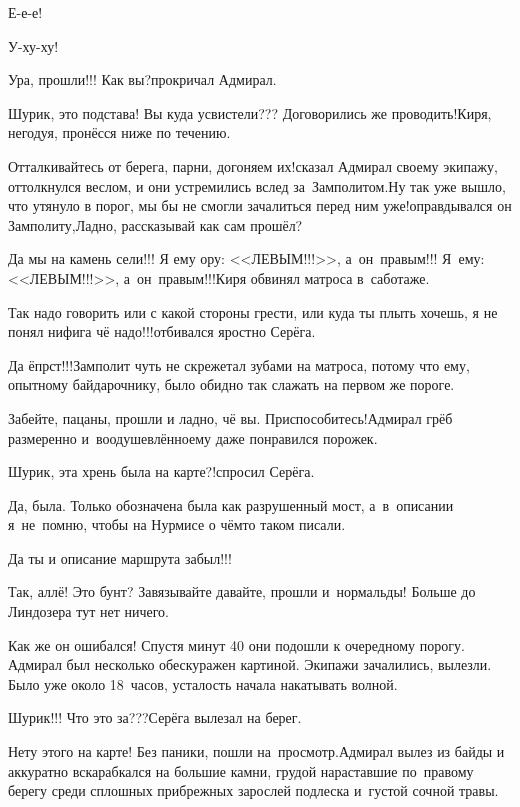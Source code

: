 \diagdash Е-е-е!

\diagdash У-ху-ху!

\diagdash Ура, прошли!!! Как вы?\mdash прокричал Адмирал.

\diagdash Шурик, это подстава! Вы куда усвистели??? Договорились же проводить!\mdash Киря, негодуя, пронёсся ниже по течению.

\diagdash Отталкивайтесь от берега, парни, догоняем их!\mdash сказал Адмирал своему экипажу, оттолкнулся веслом, и они устремились вслед за~Замполитом.\mdash Ну так уже вышло, что утянуло в порог, мы бы не смогли зачалиться перед ним уже!\mdash оправдывался он Замполиту,\mdash Ладно, рассказывай как сам прошёл?

\diagdash Да мы на камень сели!!! Я ему ору: <<ЛЕВЫМ!!!>>, а~он~правым!!! Я~ему: <<ЛЕВЫМ!!!>>, а~он~правым!!!\mdash Киря обвинял матроса в~саботаже.

\diagdash Так надо говорить или с какой стороны грести, или куда ты плыть хочешь, я не понял нифига чё надо!!!\mdash отбивался яростно Серёга.

\diagdash Да ёпрст!!!\mdash Замполит чуть не скрежетал зубами на матроса, потому что ему, опытному байдарочнику, было обидно так слажать на первом же пороге.

\diagdash Забейте, пацаны, прошли и ладно, чё вы. Приспособитесь!\mdash Адмирал грёб размеренно и~воодушевлённо\mdash ему даже понравился порожек.

\diagdash Шурик, эта хрень была на карте?!\mdash спросил Серёга.

\diagdash Да, была. Только обозначена была как разрушенный мост, а~в~описании я~не~помню, чтобы на Нурмисе о чём\sdash то таком писали.

\diagdash Да ты и описание маршрута забыл!!!

\diagdash Так, аллё! Это бунт? Завязывайте давайте, прошли и~нормальды! Больше до Линдозера тут нет ничего.

Как же он ошибался! Спустя минут 40 они подошли к очередному порогу. Адмирал был несколько обескуражен картиной. Экипажи зачалились, вылезли. Было уже около 18~часов, усталость начала накатывать волной.

\diagdash Шурик!!! Что это за???\mdash Серёга вылезал на берег.

\diagdash Нету этого на карте! Без паники, пошли на~просмотр.\mdash Адмирал вылез из байды и аккуратно вскарабкался на большие камни, грудой нараставшие по~правому берегу среди сплошных прибрежных зарослей подлеска и~густой сочной травы.

